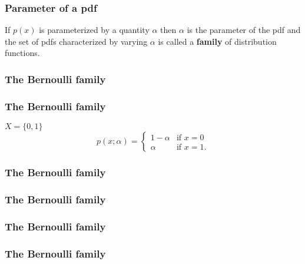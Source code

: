 \begin{frame}[fragile]\frametitle{Parameter of a pdf}

\begin{defn}
If $p(x)$ is parameterized by a quantity $\alpha$ then $\alpha$
is the parameter of the pdf and the set of pdfs characterized
by varying $\alpha$ is called a {\bf family} of distribution
functions.
\end{defn} 


\end{frame}


\begin{frame}[fragile]\frametitle{The Bernoulli family}



\end{frame}



\begin{frame}[fragile]\frametitle{The Bernoulli family}

$X = \{0,1\}$ \\
$$p(x;\alpha) = \left\{\begin{array}{ll}
			1-\alpha & \mbox{if } x =0 \\
			\alpha & \mbox{if } x=1
						   .	\end{array}
						\right.  	
$$


\end{frame}



\begin{frame}[fragile]\frametitle{The Bernoulli family}



\end{frame}

\begin{frame}[fragile]\frametitle{The Bernoulli family}



\end{frame}

\begin{frame}[fragile]\frametitle{The Bernoulli family}



\end{frame}

\begin{frame}[fragile]\frametitle{The Bernoulli family}



\end{frame}

